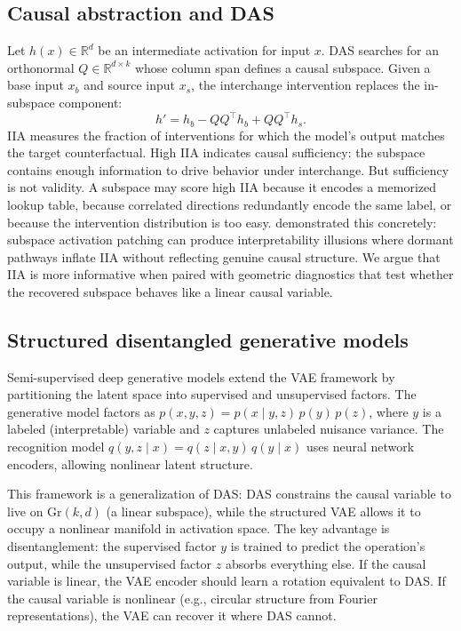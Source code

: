 \documentclass{article}
\newcommand{\Gr}{\mathrm{Gr}}
\newcommand{\R}{\mathbb{R}}
\begin{document}
\subsection{Causal abstraction and DAS}

Let $h(x) \in \R^d$ be an intermediate activation for input $x$. DAS searches
for an orthonormal $Q \in \R^{d \times k}$ whose column span defines a causal
subspace. Given a base input $x_b$ and source input $x_s$, the interchange
intervention replaces the in-subspace component:
\begin{equation}
h' = h_b - QQ^\top h_b + QQ^\top h_s .
\label{eq:intervention}
\end{equation}
IIA measures the fraction of interventions for which the model's output matches
the target counterfactual. High IIA indicates causal sufficiency: the subspace
contains enough information to drive behavior under interchange. But sufficiency
is not validity. A subspace may score high IIA because it encodes a memorized
lookup table, because correlated directions redundantly encode the same label, or
because the intervention distribution is too easy.
\citet{makelov2024illusion} demonstrated this concretely: subspace activation
patching can produce interpretability illusions where dormant pathways inflate IIA
without reflecting genuine causal structure. We argue that IIA is more informative when
paired with geometric diagnostics that test whether the recovered subspace
behaves like a linear causal variable.

\subsection{Structured disentangled generative models}
\label{sec:structured_vae}

Semi-supervised deep generative models \citep{narayanaswamy2017learning} extend
the VAE framework \citep{kingma2014auto} by partitioning the latent space into
supervised and unsupervised factors. The generative model factors as
$p(x, y, z) = p(x \mid y, z) \, p(y) \, p(z)$, where $y$ is a labeled
(interpretable) variable and $z$ captures unlabeled nuisance variance. The
recognition model $q(y, z \mid x) = q(z \mid x, y) \, q(y \mid x)$ uses neural
network encoders, allowing nonlinear latent structure.

This framework is a generalization of DAS: DAS constrains the causal
variable to live on $\Gr(k,d)$ (a linear subspace), while the structured VAE
allows it to occupy a nonlinear manifold in activation space. The key advantage
is disentanglement: the supervised factor $y$ is trained to predict the
operation's output, while the unsupervised factor $z$ absorbs everything else.
If the causal variable is linear, the VAE encoder should learn a rotation
equivalent to DAS. If the causal variable is nonlinear (e.g., circular
structure from Fourier representations), the VAE can recover it where DAS
cannot.
\end{document}
